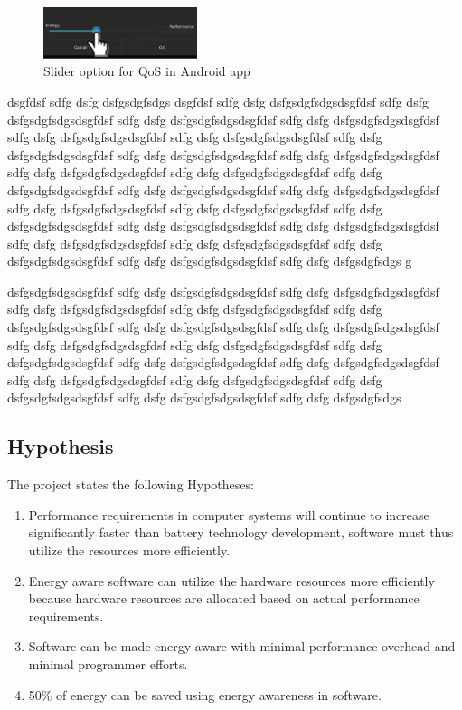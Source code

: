 \documentclass{article}
\begin{document}
\begin{figure}
  \begin{center}
  \vspace{-0.8cm}
    \includegraphics[width=0.4\textwidth]{fig/slider.png}
  \end{center}
  \caption{Slider option for QoS in Android app}
  \label{fig:slider}
\end{figure}

dsgfdsf sdfg dsfg dsfgsdgfsdgs
dsgfdsf sdfg dsfg dsfgsdgfsdgsdsgfdsf sdfg dsfg dsfgsdgfsdgsdsgfdsf sdfg dsfg dsfgsdgfsdgsdsgfdsf sdfg dsfg dsfgsdgfsdgsdsgfdsf sdfg dsfg dsfgsdgfsdgsdsgfdsf sdfg dsfg dsfgsdgfsdgsdsgfdsf sdfg dsfg dsfgsdgfsdgsdsgfdsf sdfg dsfg dsfgsdgfsdgsdsgfdsf sdfg dsfg dsfgsdgfsdgsdsgfdsf sdfg dsfg dsfgsdgfsdgsdsgfdsf sdfg dsfg dsfgsdgfsdgsdsgfdsf sdfg dsfg dsfgsdgfsdgsdsgfdsf sdfg dsfg dsfgsdgfsdgsdsgfdsf sdfg dsfg dsfgsdgfsdgsdsgfdsf sdfg dsfg dsfgsdgfsdgsdsgfdsf sdfg dsfg dsfgsdgfsdgsdsgfdsf sdfg dsfg dsfgsdgfsdgsdsgfdsf sdfg dsfg dsfgsdgfsdgsdsgfdsf sdfg dsfg dsfgsdgfsdgsdsgfdsf sdfg dsfg dsfgsdgfsdgsdsgfdsf sdfg dsfg dsfgsdgfsdgsdsgfdsf sdfg dsfg dsfgsdgfsdgsdsgfdsf sdfg dsfg dsfgsdgfsdgsdsgfdsf sdfg dsfg dsfgsdgfsdgs
g

dsfgsdgfsdgsdsgfdsf sdfg dsfg dsfgsdgfsdgsdsgfdsf sdfg dsfg dsfgsdgfsdgsdsgfdsf sdfg dsfg dsfgsdgfsdgsdsgfdsf sdfg dsfg dsfgsdgfsdgsdsgfdsf sdfg dsfg dsfgsdgfsdgsdsgfdsf sdfg dsfg dsfgsdgfsdgsdsgfdsf sdfg dsfg dsfgsdgfsdgsdsgfdsf sdfg dsfg dsfgsdgfsdgsdsgfdsf sdfg dsfg dsfgsdgfsdgsdsgfdsf sdfg dsfg dsfgsdgfsdgsdsgfdsf sdfg dsfg dsfgsdgfsdgsdsgfdsf sdfg dsfg dsfgsdgfsdgsdsgfdsf sdfg dsfg dsfgsdgfsdgsdsgfdsf sdfg dsfg dsfgsdgfsdgsdsgfdsf sdfg dsfg dsfgsdgfsdgsdsgfdsf sdfg dsfg dsfgsdgfsdgsdsgfdsf sdfg dsfg dsfgsdgfsdgs

\subsection{Hypothesis}
The project states the following Hypotheses:
\begin{enumerate}
 \item Performance requirements in computer systems will continue to increase significantly faster than battery technology development, software must thus utilize the resources more efficiently.
 \item Energy aware software can utilize the hardware resources more efficiently because hardware resources are allocated based on actual performance requirements.
 \item Software can be made energy aware with minimal performance overhead and minimal programmer efforts.
 \item 50\% of energy can be saved using energy awareness in software.
\end{enumerate}
\end{document}
